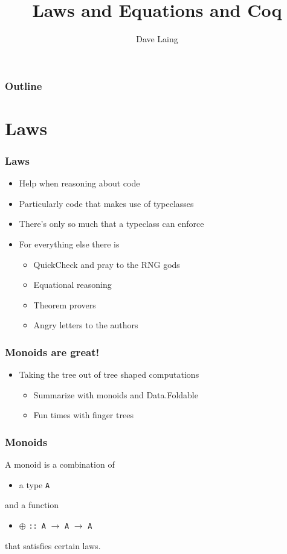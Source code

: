 \documentclass{beamer}
\title{Laws and Equations and Coq}
\author{Dave Laing}
\begin{document}
\begin{frame}
    \titlepage
\end{frame}

\begin{frame}
    \frametitle{Outline}
    \tableofcontents[pausesections]
\end{frame}

\section{Laws}

\begin{frame}
    \frametitle {Laws}

\begin{itemize}
\item Help when reasoning about code
\item Particularly code that makes use of typeclasses
\item There's only so much that a typeclass can enforce
\item For everything else there is
    \begin{itemize}
        \item QuickCheck and pray to the RNG gods
        \item Equational reasoning
        \item Theorem provers
        \item Angry letters to the authors
    \end{itemize}
\end{itemize}

\end{frame}

\begin{frame}
    \frametitle {Monoids are great!}
\begin{itemize}
\item Taking the tree out of tree shaped computations
    \begin{itemize}
        \item Summarize with monoids and Data.Foldable
        \item Fun times with finger trees
    \end{itemize}
\end{itemize}
\end{frame}

\begin{frame}[fragile]
    \frametitle {Monoids}

A monoid is a combination of 
\begin{itemize}
\item a type \verb?A?
\end{itemize}
and a function
\begin{itemize}
\item $\oplus$ \verb?:: A? $\rightarrow$ \verb?A? $\rightarrow$ \verb?A? 
\end{itemize}
that satisfies certain laws.

\end{frame}
\end{document}
